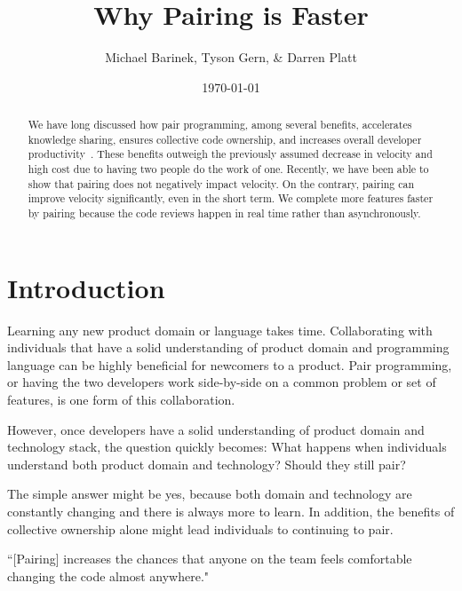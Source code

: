 \documentclass[letterpaper]{article}
\title{Why Pairing is Faster}
\author{Michael Barinek, Tyson Gern, \& Darren Platt}
\date{\today}
\theoremstyle{definition}
\begin{document}
    \maketitle

    \begin{abstract}
        We have long discussed how pair programming, among several benefits, accelerates knowledge sharing, ensures
        collective code ownership, and increases overall developer productivity~\cite{fowler:pairing}.
        These benefits outweigh the previously assumed decrease in velocity and high cost due to having two people do
        the work of one.
        Recently, we have been able to show that pairing does not negatively impact velocity.
        On the contrary, pairing can improve velocity significantly, even in the short term.
        We complete more features faster by pairing because the code reviews happen in real time rather than
        asynchronously.
    \end{abstract}


    \section{Introduction}\label{sec:introduction}

    Learning any new product domain or language takes time.
    Collaborating with individuals that have a solid understanding of product domain and programming language can be
    highly beneficial for newcomers to a product.
    Pair programming, or having the two developers work side-by-side on a common problem or set of features, is one form
    of this collaboration.

    However, once developers have a solid understanding of product domain and technology stack, the question quickly
    becomes: What happens when individuals understand both product domain and technology?
    Should they still pair?

    The simple answer might be yes, because both domain and technology are constantly changing and there is always more
    to learn.
    In addition, the benefits of collective ownership alone might lead individuals to continuing to pair.

    \begin{displayquote}
        ``[Pairing] increases the chances that anyone on the team feels comfortable changing the code almost anywhere."
    \end{displayquote}
\end{document}
